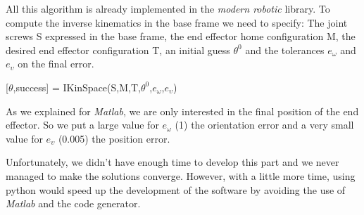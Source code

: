 \bigbreak
 All this algorithm is already implemented in the \textit{modern robotic} library. To compute the inverse kinematics in the base frame we need to specify: The joint screws S expressed in the base frame, the end effector home configuration M, the desired end effector configuration T, an initial guess $\theta^0$ and the tolerances $e_\omega$ and $e_\upsilon$ on the final error.
 \begin{center}
     [$\theta$,success] = IKinSpace(S,M,T,$\theta^0$,$e_\omega$,$e_\upsilon$)
 \end{center}
 
 As we explained for \textit{Matlab}, we are only interested in the final position of the end effector. So we put a large value for $e_\omega$ (1) the orientation error and a very small value for $e_\upsilon$ (0.005) the position error.
 
 \bigbreak
 Unfortunately, we didn't have enough time to develop this part and we never managed to make the solutions converge. However, with a little more time, using python would speed up the development of the software by avoiding the use of \textit{Matlab} and the code generator.